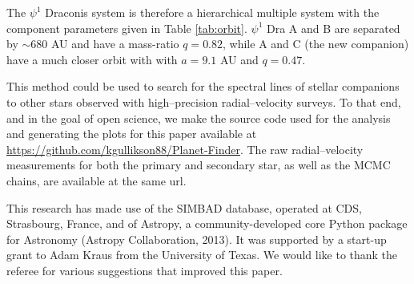 \documentclass[twocolumn]{emulateapj}
\begin{document}
The $\psi^1$ Draconis system is therefore a hierarchical multiple system with the component parameters given in Table \ref{tab:orbit}. $\psi^1$ Dra A and B are separated by ${\sim}680$ AU and have a mass-ratio $q = 0.82$, while A and C (the new companion) have a much closer orbit with with $a = 9.1$ AU and $q = 0.47$. 

This method could be used to search for the spectral lines of stellar companions to other stars observed with high--precision radial--velocity surveys. To that end, and in the goal of open science, we make the source code used for the analysis and generating the plots for this paper available at \url{https://github.com/kgullikson88/Planet-Finder}. The raw radial--velocity measurements for both the primary and secondary star, as well as the MCMC chains, are available at the same url.

This research has made use of the SIMBAD database, operated at CDS, Strasbourg, France, and of Astropy, a community-developed core Python package for Astronomy (Astropy Collaboration, 2013).
It was supported by a start-up grant to Adam Kraus from the University of Texas. We would like to thank the referee for various suggestions that improved this paper.



\newpage

\end{document}
